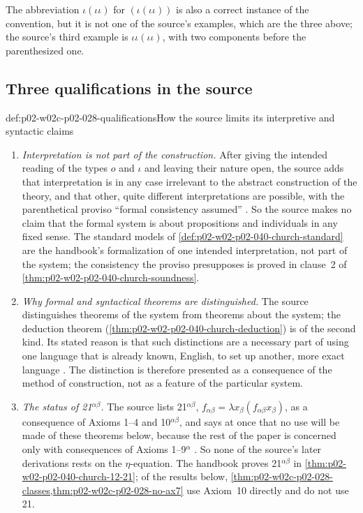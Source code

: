 The abbreviation \(\iota(\iota\iota)\) for \((\iota(\iota\iota))\) is also a
correct instance of the convention, but it is not one of the source's
examples, which are the three above; the source's third example is
\(\iota\iota(\iota\iota)\), with two components before the parenthesized
one.

\subsection{Three qualifications in the source}

\begin{hbwarning}{def:p02-w02c-p02-028-qualifications}{How the source limits its interpretive and syntactic claims}
\begin{enumerate}
 \item \emph{Interpretation is not part of the construction.}  After giving
   the intended reading of the types \(o\) and \(\iota\) and leaving their
   nature open, the source adds that interpretation is in any case irrelevant
   to the abstract construction of the theory, and that other, quite
   different interpretations are possible, with the parenthetical proviso
   ``formal consistency assumed'' \cite[\S1, p.~57]{Church1940}.  So the
   source makes no claim that the formal system is about propositions and
   individuals in any fixed sense.  The standard models of
   \cref{def:p02-w02-p02-040-church-standard} are the handbook's
   formalization of one intended interpretation, not part of the system;
   the consistency the proviso presupposes is proved in clause~2 of
   \cref{thm:p02-w02-p02-040-church-soundness}.
 \item \emph{Why formal and syntactical theorems are distinguished.}  The
   source distinguishes theorems of the system from theorems about the
   system; the deduction theorem
   (\cref{thm:p02-w02-p02-040-church-deduction}) is of the second kind.
   Its stated reason is that
   such distinctions are a necessary part of using one language that is
   already known, English, to set up another, more exact language
   \cite[\S4, p.~61]{Church1940}.  The distinction is therefore presented as
   a consequence of the method of construction, not as a feature of the
   particular system.
 \item \emph{The status of 21\(^{\alpha\beta}\).}  The source lists
   21\(^{\alpha\beta}\), \(f_{\alpha\beta}=\lambda x_\beta(f_{\alpha\beta}x_\beta)\),
   as a consequence of Axioms 1--4 and 10\(^{\alpha\beta}\), and says at once
   that no use will be made of these theorems below, because the rest of the
   paper is concerned only with consequences of Axioms 1--9\(^\alpha\)
   \cite[\S5, p.~63]{Church1940}.  So none of the source's later derivations
   rests on the \(\eta\)-equation.  The handbook proves 21\(^{\alpha\beta}\)
   in \cref{thm:p02-w02-p02-040-church-12-21}; of the results below,
   \cref{thm:p02-w02c-p02-028-classes,thm:p02-w02c-p02-028-no-ax7}
   use Axiom~10 directly and do not use 21.
\end{enumerate}
\end{hbwarning}

